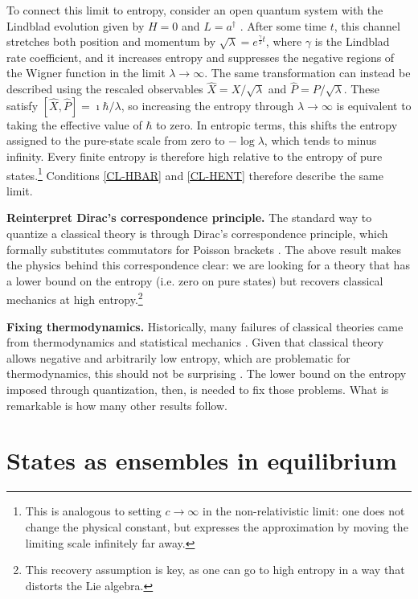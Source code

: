 \documentclass[entropy,article,submit,moreauthors]{Definitions/mdpi}
\begin{document}
To connect this limit to entropy, consider an open quantum system with the Lindblad evolution given by $H=0$ and $L=a^\dagger$ \cite{aop-phys-ClassicalHighEntropyLimit}. After some time $t$, this channel stretches both position and momentum by $\sqrt{\lambda} = e^{\frac{\gamma}{2}t}$, where $\gamma$ is the Lindblad rate coefficient, and it increases entropy and suppresses the negative regions of the Wigner function in the limit $\lambda\to\infty$. The same transformation can instead be described using the rescaled observables $\hat X=X/\sqrt{\lambda}$ and $\hat P=P/\sqrt{\lambda}$. These satisfy $[\hat X,\hat P]=\imath\hbar/\lambda$, so increasing the entropy through $\lambda\to\infty$ is equivalent to taking the effective value of $\hbar$ to zero. In entropic terms, this shifts the entropy assigned to the pure-state scale from zero to $-\log\lambda$, which tends to minus infinity. Every finite entropy is therefore high relative to the entropy of pure states.\footnote{This is analogous to setting $c\to\infty$ in the non-relativistic limit: one does not change the physical constant, but expresses the approximation by moving the limiting scale infinitely far away.} Conditions \ref{CL-HBAR} and \ref{CL-HENT} therefore describe the same limit.

\textbf{Reinterpret Dirac's correspondence principle.} The standard way to quantize a classical theory is through Dirac's correspondence principle, which formally substitutes commutators for Poisson brackets \cite{Dirac1925}. The above result makes the physics behind this correspondence clear: we are looking for a theory that has a lower bound on the entropy (i.e. zero on pure states) but recovers classical mechanics at high entropy.\footnote{This recovery assumption is key, as one can go to high entropy in a way that distorts the Lie algebra.}

\textbf{Fixing thermodynamics.} Historically, many failures of classical theories came from thermodynamics and statistical mechanics \cite{Taschetto2025,EisbergResnick1985,FayngoldFayngold2013}. Given that classical theory allows negative and arbitrarily low entropy, which are problematic for thermodynamics, this should not be surprising \cite{Wehrl1991}. The lower bound on the entropy imposed through quantization, then, is needed to fix those problems. What is remarkable is how many other results follow.

\section{States as ensembles in equilibrium}
\end{document}
